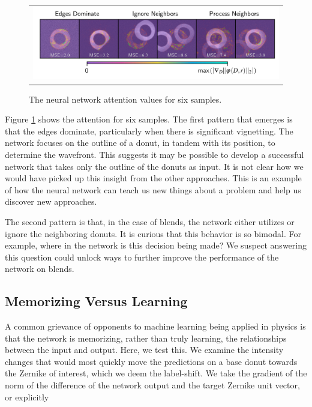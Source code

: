 \begin{figure}[!htbp]
\begin{center}
\begin{tabular}{c}
\includegraphics[width=\textwidth]{figs/cnn/attention.png}
\end{tabular}
\end{center}
\caption[Neural Network Attention]{The neural network attention values for six samples.\label{fig:attention}}
\end{figure}

Figure \ref{fig:attention} shows the attention for six samples. The first pattern that emerges is that the edges dominate, particularly when there is significant vignetting. The network focuses on the outline of a donut, in tandem with its position, to determine the wavefront. This suggests it may be possible to develop a successful network that takes only the outline of the donuts as input. It is not clear how we would have picked up this insight from the other approaches. This is an example of how the neural network can teach us new things about a problem and help us discover new approaches. 

The second pattern is that, in the case of blends, the network either utilizes or ignore the neighboring donuts. It is curious that this behavior is so bimodal. For example, where in the network is this decision being made? We suspect answering this question could unlock ways to further improve the performance of the network on blends. 

\subsection{Memorizing Versus Learning}

A common grievance of opponents to machine learning being applied in physics is that the network is memorizing, rather than truly learning, the relationships between the input and output. Here, we test this. We examine the intensity changes that would most quickly move the predictions on a base donut towards the Zernike of interest, which we deem the label-shift. We take the gradient of the norm of the difference of the network output and the target Zernike unit vector, or explicitly

